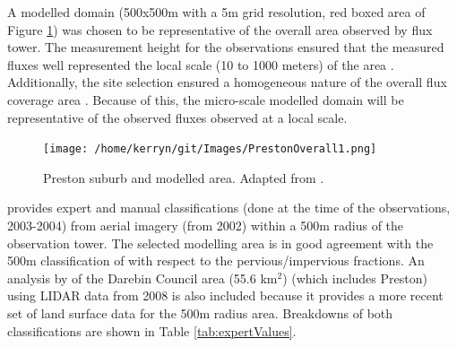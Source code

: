 \documentclass[preprint,12pt,authoryear]{elsarticle}
\begin{document}
A modelled domain (500x500m with a 5m grid resolution, red boxed area of Figure \ref{fig:PrestonModArea}) was chosen to be representative of the overall area observed by flux tower. The measurement height for the observations ensured that the measured fluxes well represented the local scale (10 to 1000 meters) of the area \citep{Coutts2007}. Additionally, the site selection ensured a homogeneous nature of the overall flux coverage area \citep{Schmid1994}. Because of this, the micro-scale modelled domain will be representative of the observed fluxes observed at a local scale. 

\begin{figure}[!htbp]
\texttt{[image: /home/kerryn/git/Images/PrestonOverall1.png]}
\caption{Preston suburb and modelled area. Adapted from \cite{GooglePreston2015}.\label{fig:PrestonModArea}} 
\end{figure}

\cite{Coutts2007} provides expert and manual classifications (done at the time of the observations, 2003-2004) from aerial imagery (from 2002) within a 500m radius of the observation tower. The selected modelling area is in good agreement with the 500m classification of \cite{Coutts2007} with respect to the pervious/impervious fractions. An analysis by \cite{Nury2015} of the Darebin Council area (55.6 km$^{2}$) (which includes Preston) using LIDAR data from 2008 is also included because it provides a more recent set of land surface data for the 500m radius area. Breakdowns of both classifications are shown in Table \ref{tab:expertValues}.
\end{document}
